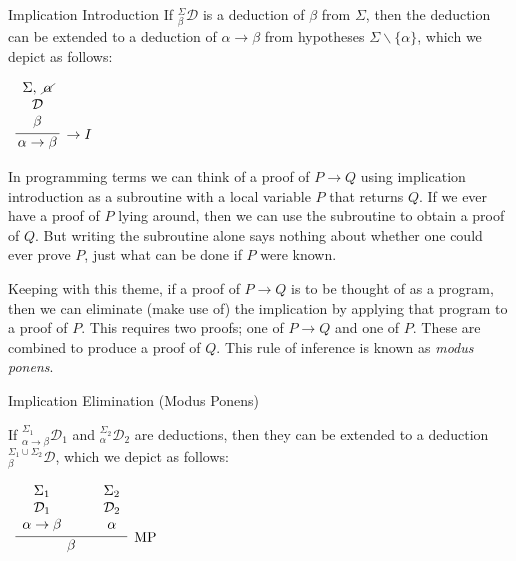 \documentclass{book}
\begin{document}
    \begin{definition}{Implication Introduction}
        If $^{\Sigma}_{\beta}\mathcal{D}$ is a deduction of $\beta$ from $\Sigma$, then the deduction can be extended to a deduction of $\alpha \rightarrow \beta$ from hypotheses $\Sigma \backslash \{\alpha\}$, which we depict as follows: 

        \begin{center}
            $\begin{array}{c}		
                \infer[\rightarrow I]{\alpha \rightarrow \beta}
                    {\begin{array}{c} \Sigma, \ \cancel{\alpha} \\ \mathcal{D} \\ \beta \end{array}}
            \end{array}$
        \end{center}
    \end{definition}

    In programming terms we can think of a proof of $P \to Q$ using implication introduction as a subroutine with a local variable $P$ that returns $Q$. If we ever have a proof of $P$ lying around, then we can use the subroutine to obtain a proof of $Q$. But writing the subroutine alone says nothing about whether one could ever prove $P$, just what can be done if $P$ were known. 

    Keeping with this theme, if a proof of $P \to Q$ is to be thought of as a program, then we can eliminate (make use of) the implication by applying that program to a proof of $P$. This requires two proofs; one of $P \to Q$ and one of $P$. These are combined to produce a proof of $Q$. This rule of inference is known as \emph{modus ponens}.

    \vspace{0.1cm}
    
    \begin{definition}{Implication Elimination (Modus Ponens)}

        If $^{\Sigma_{1}}_{\alpha \rightarrow \beta}\mathcal{D}_{1}$ and $^{\Sigma_{2}}_{\alpha}\mathcal{D}_{2}$ are deductions, then they can be extended to a deduction $^{\Sigma_{1}\cup \Sigma_{2}}_{\beta}\mathcal{D}$, which we depict as follows: 

        \begin{center}
            $\begin{array}{c}		
                \infer[\MP]{\beta}{\begin{array}{c} \Sigma_{1} \\ \mathcal{D}_{1} \\ \alpha \rightarrow \beta \end{array} \quad & \begin{array}{c} \Sigma_{2} \\ \mathcal{D}_{2} \\ \alpha \end{array}}	
            \end{array}$
        \end{center}
    \end{definition}
\end{document}
